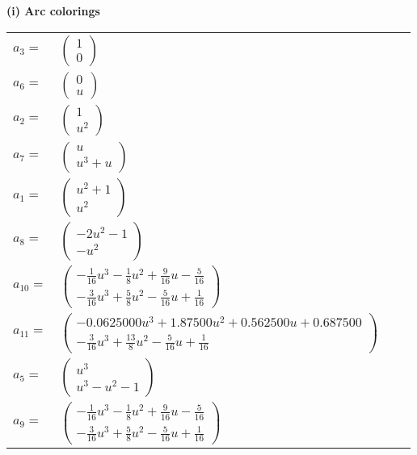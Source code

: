 \documentclass[1p]{elsarticle_modified}
\theoremstyle{definition}
\begin{document}
\flushleft \textbf{(i) Arc colorings}\\
\begin{tabular}{m{7pt} m{180pt} m{7pt} m{180pt} }
\flushright $a_{3}=$&$\begin{pmatrix}1\\0\end{pmatrix}$ \\
\flushright $a_{6}=$&$\begin{pmatrix}0\\u\end{pmatrix}$ \\
\flushright $a_{2}=$&$\begin{pmatrix}1\\u^2\end{pmatrix}$ \\
\flushright $a_{7}=$&$\begin{pmatrix}u\\u^3+u\end{pmatrix}$ \\
\flushright $a_{1}=$&$\begin{pmatrix}u^2+1\\u^2\end{pmatrix}$ \\
\flushright $a_{8}=$&$\begin{pmatrix}-2 u^2-1\\- u^2\end{pmatrix}$ \\
\flushright $a_{10}=$&$\begin{pmatrix}-\frac{1}{16} u^3-\frac{1}{8} u^2+\frac{9}{16} u-\frac{5}{16}\\-\frac{3}{16} u^3+\frac{5}{8} u^2-\frac{5}{16} u+\frac{1}{16}\end{pmatrix}$ \\
\flushright $a_{11}=$&$\begin{pmatrix}-0.0625000 u^{3}+1.87500 u^{2}+0.562500 u+0.687500\\-\frac{3}{16} u^3+\frac{13}{8} u^2-\frac{5}{16} u+\frac{1}{16}\end{pmatrix}$ \\
\flushright $a_{5}=$&$\begin{pmatrix}u^3\\u^3- u^2-1\end{pmatrix}$ \\
\flushright $a_{9}=$&$\begin{pmatrix}-\frac{1}{16} u^3-\frac{1}{8} u^2+\frac{9}{16} u-\frac{5}{16}\\-\frac{3}{16} u^3+\frac{5}{8} u^2-\frac{5}{16} u+\frac{1}{16}\end{pmatrix}$ \\

\end{tabular}
\end{document}
